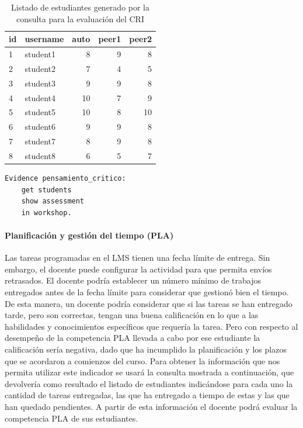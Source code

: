 \begin{table}[h]
	\centering
	\caption{Listado de estudiantes generado por la consulta para la evaluación del CRI}
	\label{cha_eval-tab:ejemplo-critico}
	\begin{tabular}{|l|l|r|r|r|}
		\hline
		id & username & auto & peer1 & peer2 \\
		\hline
		\hline
		1 & student1 & 8 & 9 & 8  \\
		\hline
		2 & student2 & 7 & 4 & 5  \\
		\hline
		3 & student3 & 9 & 9 & 8  \\
		\hline
		4 & student4 & 10 & 7 & 9  \\
		\hline
		5 & student5 & 10 & 8 & 10  \\
		\hline
		6 & student6 & 9 & 9 & 8  \\
		\hline
		7 & student7 & 8 & 9 & 8  \\
		\hline
		8 & student8 & 6 & 5 & 7  \\
		\hline
	\end{tabular}
\end{table}

\begin{verbatim}
Evidence pensamiento_critico:  
	get students 
	show assessment 
	in workshop.
\end{verbatim}

				\paragraph*{Planificación y gestión del tiempo (PLA)}
				Las tareas programadas en el LMS tienen una fecha límite de entrega. Sin embargo, el docente puede configurar la actividad para que permita envíos retrasados. El docente podría establecer un número mínimo de trabajos entregados antes de la fecha límite para considerar que gestionó bien el tiempo. De esta manera, un docente podría considerar que si las tareas se han entregado tarde, pero son correctas, tengan una buena calificación en lo que a las habilidades y conocimientos específicos que requería la tarea. Pero con respecto al desempeño de la competencia PLA llevada a cabo por ese estudiante la calificación sería negativa, dado que ha incumplido la planificación y los plazos que se acordaron a comienzos del curso. Para obtener la información que nos permita utilizar este indicador se usará la consulta mostrada a continuación, que devolvería como resultado el listado de estudiantes indicándose para cada uno la cantidad de tareas entregadas, las que ha entregado a tiempo de estas y las que han quedado pendientes. A partir de esta información el docente podrá evaluar la competencia PLA de sus estudiantes.

